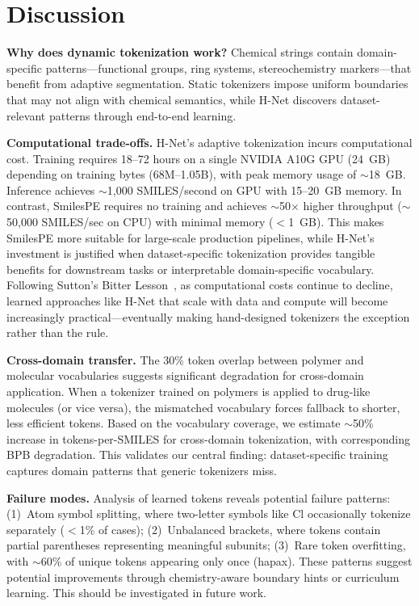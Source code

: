 \documentclass{article}
\newcommand{\hnet}{H-Net}
\newcommand{\smilespe}{SmilesPE}
\begin{document}
\section{Discussion}
\label{sec:discussion}

\textbf{Why does dynamic tokenization work?}
Chemical strings contain domain-specific patterns---functional groups, ring systems, stereochemistry markers---that benefit from adaptive segmentation. Static tokenizers impose uniform boundaries that may not align with chemical semantics, while \hnet{} discovers dataset-relevant patterns through end-to-end learning.

\textbf{Computational trade-offs.}
\hnet{}'s adaptive tokenization incurs computational cost. Training requires 18--72 hours on a single NVIDIA A10G GPU (24~GB) depending on training bytes (68M--1.05B), with peak memory usage of $\sim$18~GB. Inference achieves $\sim$1,000 SMILES/second on GPU with 15--20~GB memory. In contrast, \smilespe{} requires no training and achieves $\sim$50$\times$ higher throughput ($\sim$50,000 SMILES/sec on CPU) with minimal memory ($<$1~GB). This makes \smilespe{} more suitable for large-scale production pipelines, while \hnet{}'s investment is justified when dataset-specific tokenization provides tangible benefits for downstream tasks or interpretable domain-specific vocabulary. Following Sutton's Bitter Lesson~\citep{sutton2019bitter}, as computational costs continue to decline, learned approaches like \hnet{} that scale with data and compute will become increasingly practical---eventually making hand-designed tokenizers the exception rather than the rule.

\textbf{Cross-domain transfer.}
The 30\% token overlap between polymer and molecular vocabularies suggests significant degradation for cross-domain application. When a tokenizer trained on polymers is applied to drug-like molecules (or vice versa), the mismatched vocabulary forces fallback to shorter, less efficient tokens. Based on the vocabulary coverage, we estimate $\sim$50\% increase in tokens-per-SMILES for cross-domain tokenization, with corresponding BPB degradation. This validates our central finding: dataset-specific training captures domain patterns that generic tokenizers miss.

\textbf{Failure modes.}
Analysis of learned tokens reveals potential failure patterns: (1)~Atom symbol splitting, where two-letter symbols like Cl occasionally tokenize separately ($<$1\% of cases); (2)~Unbalanced brackets, where tokens contain partial parentheses representing meaningful subunits; (3)~Rare token overfitting, with $\sim$60\% of unique tokens appearing only once (hapax). These patterns suggest potential improvements through chemistry-aware boundary hints or curriculum learning. This should be investigated in future work.
\end{document}
